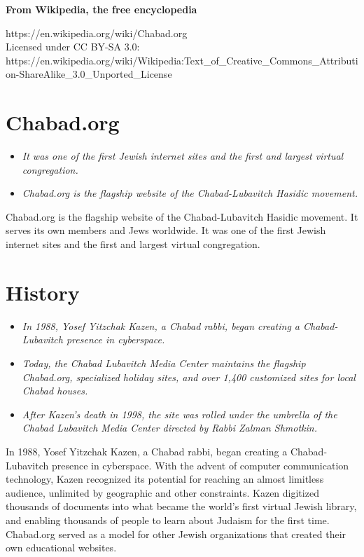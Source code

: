 \textbf{From Wikipedia, the free encyclopedia}

https://en.wikipedia.org/wiki/Chabad.org\\
Licensed under CC BY-SA 3.0:\\
https://en.wikipedia.org/wiki/Wikipedia:Text\_of\_Creative\_Commons\_Attribution-ShareAlike\_3.0\_Unported\_License

\section{Chabad.org}\label{chabad.org}

\begin{itemize}
\item
  \emph{It was one of the first Jewish internet sites and the first and
  largest virtual congregation.}
\item
  \emph{Chabad.org is the flagship website of the Chabad-Lubavitch
  Hasidic movement.}
\end{itemize}

Chabad.org is the flagship website of the Chabad-Lubavitch Hasidic
movement. It serves its own members and Jews worldwide. It was one of
the first Jewish internet sites and the first and largest virtual
congregation.

\section{History}\label{history}

\begin{itemize}
\item
  \emph{In 1988, Yosef Yitzchak Kazen, a Chabad rabbi, began creating a
  Chabad-Lubavitch presence in cyberspace.}
\item
  \emph{Today, the Chabad Lubavitch Media Center maintains the flagship
  Chabad.org, specialized holiday sites, and over 1,400 customized sites
  for local Chabad houses.}
\item
  \emph{After Kazen's death in 1998, the site was rolled under the
  umbrella of the Chabad Lubavitch Media Center directed by Rabbi Zalman
  Shmotkin.}
\end{itemize}

In 1988, Yosef Yitzchak Kazen, a Chabad rabbi, began creating a
Chabad-Lubavitch presence in cyberspace. With the advent of computer
communication technology, Kazen recognized its potential for reaching an
almost limitless audience, unlimited by geographic and other
constraints. Kazen digitized thousands of documents into what became the
world's first virtual Jewish library, and enabling thousands of people
to learn about Judaism for the first time. Chabad.org served as a model
for other Jewish organizations that created their own educational
websites.

